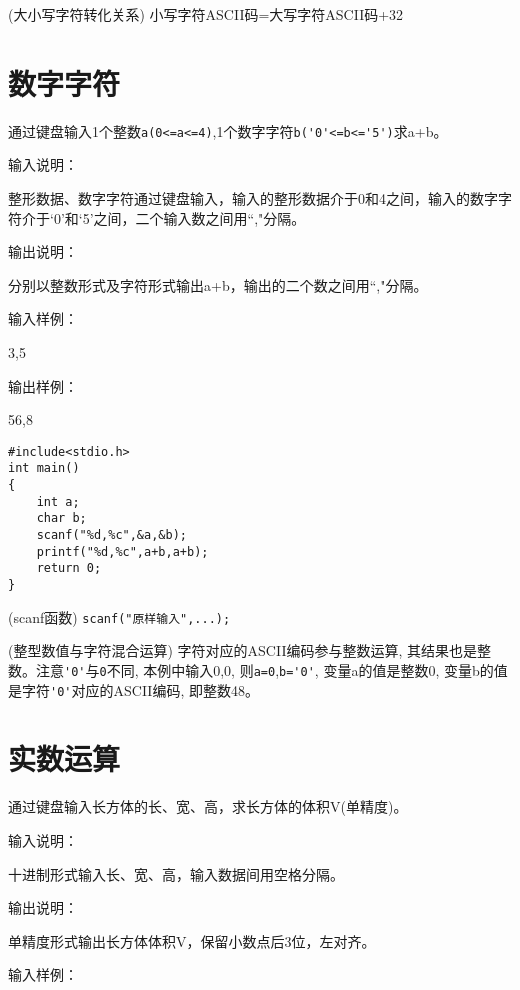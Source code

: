 \begin{note}(大小写字符转化关系)
	小写字符ASCII码=大写字符ASCII码+32
\end{note}

\section{数字字符}
通过键盘输入1个整数\lstinline|a(0<=a<=4)|,1个数字字符\lstinline|b('0'<=b<='5')|求a+b。

输入说明：

整形数据、数字字符通过键盘输入，输入的整形数据介于0和4之间，输入的数字字符介于`0'和`5'之间，二个输入数之间用``,"分隔。

输出说明：

分别以整数形式及字符形式输出a+b，输出的二个数之间用``,"分隔。

输入样例：

3,5

输出样例：

56,8

\newpage

\begin{lstlisting}
#include<stdio.h>    
int main()                   
{  
	int a;
	char b;
	scanf("%d,%c",&a,&b);
	printf("%d,%c",a+b,a+b); 
	return 0;           
}             
\end{lstlisting}

\begin{note}(scanf函数)
	\lstinline|scanf("原样输入",...); |
\end{note}

\begin{note}(整型数值与字符混合运算)
	字符对应的ASCII编码参与整数运算, 其结果也是整数。注意\lstinline|'0'|与\lstinline|0|不同, 本例中输入0,0, 则\lstinline|a=0|,\lstinline|b='0'|, 变量a的值是整数0, 变量b的值是字符\lstinline|'0'|对应的ASCII编码, 即整数48。
\end{note}

\section{实数运算}
通过键盘输入长方体的长、宽、高，求长方体的体积V(单精度)。

输入说明：

十进制形式输入长、宽、高，输入数据间用空格分隔。

输出说明：

单精度形式输出长方体体积V，保留小数点后3位，左对齐。

输入样例：

